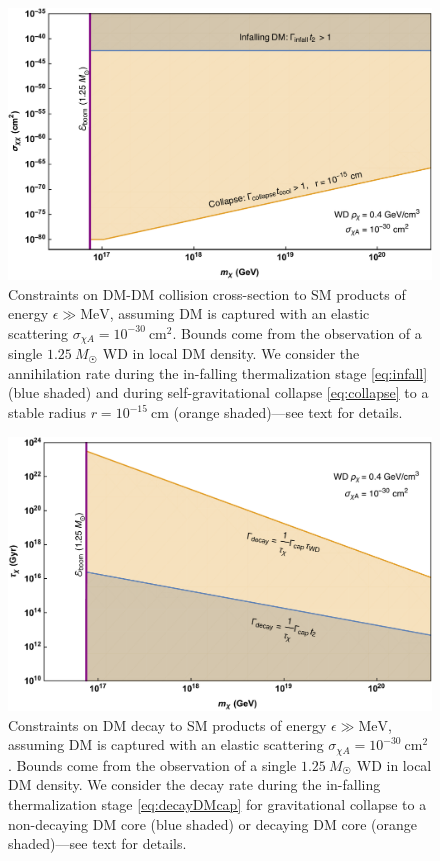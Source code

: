 \documentclass[twocolumn, preprintnumbers,amsmath,amssymb,prd, superscriptaddress]{revtex4}
\newcommand{\MeV}{\text{MeV}}
\newcommand{\cm}{\text{cm}}
\begin{document}
\begin{figure}
\includegraphics[scale=.35]{capturecollision.pdf}
\caption{Constraints on DM-DM collision cross-section to SM products of energy $\epsilon \gg \MeV$, assuming DM is captured with an elastic scattering $\sigma_{\chi A} = 10^{-30} ~\cm^2$.
Bounds come from the observation of a single $1.25~M_{\astrosun}$ WD in local DM density.
We consider the annihilation rate during the in-falling thermalization stage \eqref{eq:infall} (blue shaded) and during self-gravitational collapse \eqref{eq:collapse} to a stable radius $r = 10^{-15} ~\cm$ (orange shaded)---see text for details.
}
\label{fig:capture-collision}
\end{figure}

\begin{figure}
\includegraphics[scale=.35]{capturedecay.pdf}
\caption{Constraints on DM decay to SM products of energy $\epsilon \gg \MeV$, assuming DM is captured with an elastic scattering $\sigma_{\chi A} = 10^{-30} ~\cm^2$.
Bounds come from the observation of a single $1.25~M_{\astrosun}$ WD in local DM density.
We consider the decay rate during the in-falling thermalization stage \eqref{eq:decayDMcap} for gravitational collapse to a non-decaying DM core (blue shaded) or decaying DM core (orange shaded)---see text for details.
}
\label{fig:capture-decay}
\end{figure}
\end{document}
